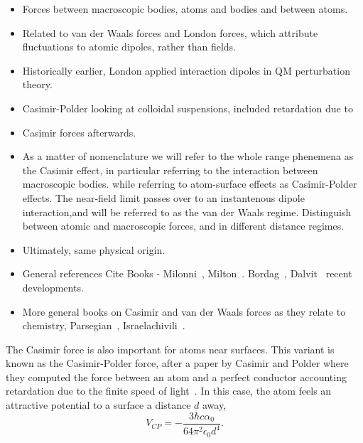 \begin{itemize}
\item Forces between macroscopic bodies, atoms and bodies and between atoms.  
\item Related to van der Waals forces and London forces, which attribute fluctuations
    to atomic dipoles, rather than fields.
\item Historically earlier, London applied interaction dipoles in QM perturbation theory.
\item Casimir-Polder looking at colloidal suspensions, included retardation due to 
\item Casimir forces afterwards.  
\item As a matter of nomenclature we will refer to the whole range phenemena as the Casimir effect,
in particular referring to the interaction between macroscopic bodies.  
while referring to atom-surface effects as Casimir-Polder effects.  The near-field limit
passes over to an instantenous dipole interaction,and will be referred to as the van der Waals regime.  
Distinguish between atomic and macroscopic forces, and in different distance regimes.
\item Ultimately, same physical origin.  
\end{itemize}

\begin{itemize}
\item General references Cite Books - Milonni~\cite{Milonni1994}, Milton~\cite{Milton2001}.
  Bordag~\cite{Bordag2009}, Dalvit~\cite{Dalvit2011} recent developments.  
\item More general books on Casimir and van der Waals forces as they relate to chemistry, 
  Parsegian~\cite{Parsegian2006}, Israelachivili~\cite{Israelachvili2011}.
\end{itemize}


The Casimir force is also important for atoms near surfaces.  
This variant is known as the Casimir-Polder force, 
after a paper by Casimir and Polder where they computed the force between an 
atom and a perfect conductor accounting retardation due to the finite speed 
of light~\cite{CasimirPolder1948}.  
In this case, the atom feels an attractive potential to a surface a distance $d$ away,
\begin{equation}
V_{CP} =-\frac{3\hbar c\alpha_0}{64\pi^2\epsilon_0 d^4}.
\end{equation}


